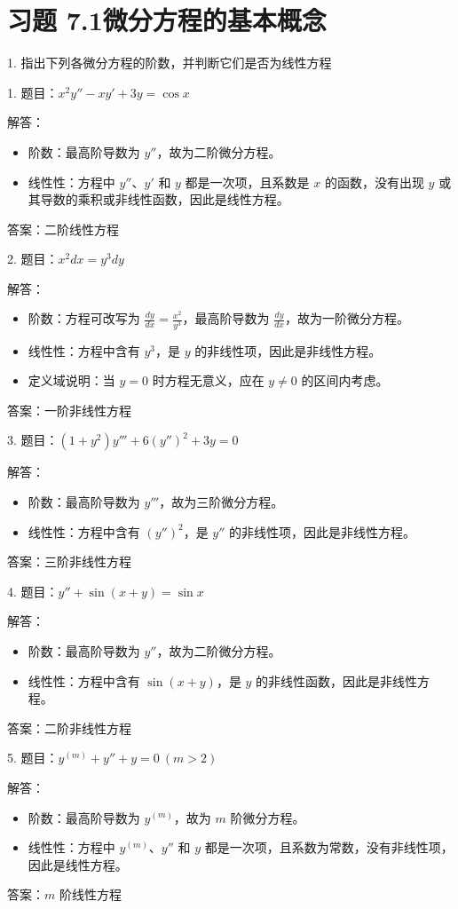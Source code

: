 \section*{习题 7.1\quad 微分方程的基本概念}

1. 指出下列各微分方程的阶数，并判断它们是否为线性方程

1. 题目：\(x^{2}y''-xy'+3y=\cos x\)

解答：
\begin{itemize}
\item 阶数：最高阶导数为 \(y''\)，故为二阶微分方程。
\item 线性性：方程中 \(y''\)、\(y'\) 和 \(y\) 都是一次项，且系数是 \(x\) 的函数，没有出现 \(y\) 或其导数的乘积或非线性函数，因此是线性方程。
\end{itemize}
答案：二阶线性方程

2. 题目：\(x^{2}dx=y^{3}dy\)

解答：
\begin{itemize}
\item 阶数：方程可改写为 \(\frac{dy}{dx}=\frac{x^{2}}{y^{3}}\)，最高阶导数为 \(\frac{dy}{dx}\)，故为一阶微分方程。
\item 线性性：方程中含有 \(y^{3}\)，是 \(y\) 的非线性项，因此是非线性方程。
\item 定义域说明：当 \(y=0\) 时方程无意义，应在 \(y\ne0\) 的区间内考虑。
\end{itemize}
答案：一阶非线性方程

3. 题目：\((1+y^{2})y'''+6(y'')^{2}+3y=0\)

解答：
\begin{itemize}
\item 阶数：最高阶导数为 \(y'''\)，故为三阶微分方程。
\item 线性性：方程中含有 \((y'')^{2}\)，是 \(y''\) 的非线性项，因此是非线性方程。
\end{itemize}
答案：三阶非线性方程

4. 题目：\(y''+\sin(x+y)=\sin x\)

解答：
\begin{itemize}
\item 阶数：最高阶导数为 \(y''\)，故为二阶微分方程。
\item 线性性：方程中含有 \(\sin(x+y)\)，是 \(y\) 的非线性函数，因此是非线性方程。
\end{itemize}
答案：二阶非线性方程

5. 题目：\(y^{(m)}+y''+y=0\ (m>2)\)

解答：
\begin{itemize}
\item 阶数：最高阶导数为 \(y^{(m)}\)，故为 \(m\) 阶微分方程。
\item 线性性：方程中 \(y^{(m)}\)、\(y''\) 和 \(y\) 都是一次项，且系数为常数，没有非线性项，因此是线性方程。
\end{itemize}
答案：\(m\) 阶线性方程

